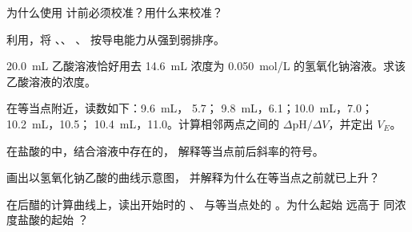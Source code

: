 \begin{exercise}[$\star$]\label{exo:g12:ph-conductivity-titrations:4}
为什么使用  计前必须校准？用什么来校准？
\end{exercise}

\begin{exercise}[$\star$]\label{exo:g12:ph-conductivity-titrations:5}
利用，将 、、
、 按导电能力从强到弱排序。
\end{exercise}

\begin{exercise}[$\star\star$]\label{exo:g12:ph-conductivity-titrations:6}
\qty{20.0}{mL} 乙酸溶液恰好用去 \qty{14.6}{mL}
浓度为 \qty{0.050}{mol/L} 的氢氧化钠溶液。求该乙酸溶液的浓度。
\end{exercise}

\begin{exercise}[$\star\star$]\label{exo:g12:ph-conductivity-titrations:7}
在等当点附近，读数如下：\qty{9.6}{mL}， 5.7；
\qty{9.8}{mL}，6.1；\qty{10.0}{mL}，7.0；\qty{10.2}{mL}，10.5；
\qty{10.4}{mL}，11.0。计算相邻两点之间的
$\Delta\mathrm{pH}/\Delta V$，并定出 $V_E$。
\end{exercise}

\begin{exercise}[$\star\star$]\label{exo:g12:ph-conductivity-titrations:8}
在盐酸的中，结合溶液中存在的，
解释等当点前后斜率的符号。
\end{exercise}

\begin{exercise}[$\star\star$]\label{exo:g12:ph-conductivity-titrations:9}
画出以氢氧化钠乙酸的曲线示意图，
并解释为什么在等当点之前就已上升？
\end{exercise}

\begin{exercise}[$\star\star$]\label{exo:g12:ph-conductivity-titrations:10}
在后醋的计算曲线上，读出开始时的 、
与等当点处的 。为什么起始  远高于
同浓度盐酸的起始 ？
\end{exercise}

